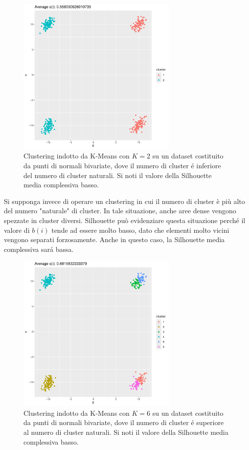 \documentclass[a4paper, 12pt]{report}
\begin{document}
			\begin{figure}[H]
				\centering
				\includegraphics[width = 0.7\textwidth]{doc/clusters-2.pdf}
				\caption{Clustering indotto da K-Means con $K = 2$ su un
				dataset costituito da punti di normali bivariate, dove
				il numero di cluster é inferiore del numero di cluster
				naturali. Si noti il valore della Silhouette media
				complessiva basso.}
				\label{fig:k2}
			\end{figure}

			Si supponga invece di operare un clustering in cui il numero
			di cluster è più alto del numero "naturale" di cluster. In tale
			situazione, anche aree dense vengono spezzate in cluster diversi.
			Silhouette può evidenziare questa situazione perché il valore di
			$b(i)$ tende ad essere molto basso, dato che elementi molto vicini
			vengono separati forzosamente. Anche in questo caso, la Silhouette
			media complessiva sará bassa.

			\begin{figure}[H]
				\centering
				\includegraphics[width = 0.7\textwidth]{doc/clusters-6.pdf}
				\caption{Clustering indotto da K-Means con $K = 6$ su un
				dataset costituito da punti di normali bivariate, dove
				il numero di cluster é superiore al numero di cluster
				naturali. Si noti il valore della Silhouette media
				complessiva basso.}
				\label{fig:k6}
			\end{figure}
\end{document}
